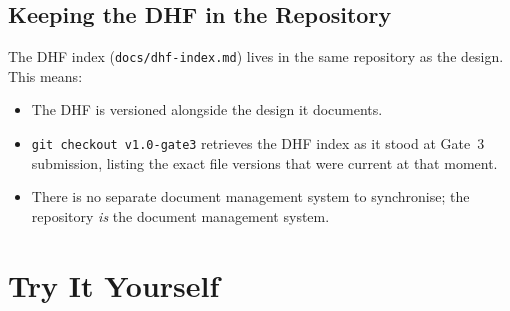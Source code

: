 \subsection{Keeping the DHF in the Repository}
\label{subsec:ch13-dhf-in-repo}

The DHF index (\texttt{docs/dhf-index.md}) lives in the
same repository as the design.
This means:
\begin{itemize}
  \item The DHF is versioned alongside the design it documents.
  \item \texttt{git checkout v1.0-gate3} retrieves the DHF index as it stood at Gate~3
        submission, listing the exact file versions that were current at that moment.
  \item There is no separate document management system to synchronise; the repository
        \emph{is} the document management system.
\end{itemize}

\section*{Try It Yourself}
\label{subsec:ch13-try-it}

